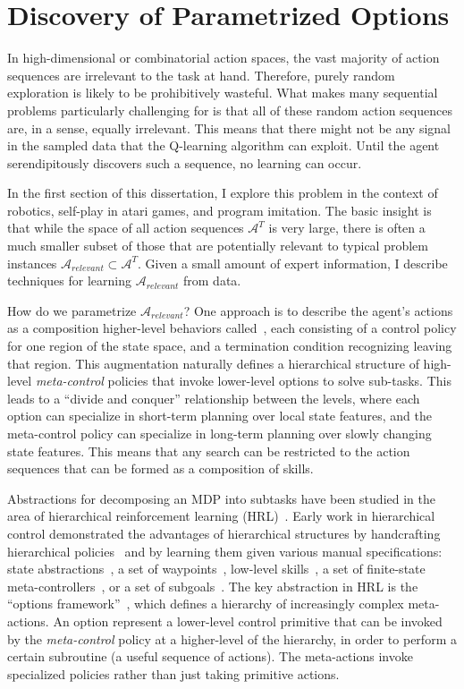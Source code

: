 \chapter{Discovery of Parametrized Options}
\setcounter{secnumdepth}{1}
In high-dimensional or combinatorial action spaces, the vast majority of action sequences are irrelevant to the task at hand.
Therefore, purely random exploration is likely to be prohibitively wasteful.
What makes many sequential problems particularly challenging for is that all of these random action sequences are, in a sense, equally irrelevant. 
This means that there might not be any signal in the sampled data that the Q-learning algorithm can exploit.
Until the agent serendipitously discovers such a sequence, no learning can occur.

In the first section of this dissertation, I explore this problem in the context of robotics, self-play in atari games, and program imitation. 
The basic insight is that while the space of all action sequences $\mathcal{A}^T$ is very large, there is often a much smaller subset of those that are potentially relevant to typical problem instances $\mathcal{A}_{relevant} \subset \mathcal{A}^T$. 
Given a small amount of expert information, I describe techniques for learning $\mathcal{A}_{relevant}$ from data.

How do we parametrize $\mathcal{A}_{relevant}$?
One approach is to describe the agent's actions as a composition higher-level behaviors called~\cite{suttonPS99}, each consisting of a control policy for one region of the state space, and a termination condition recognizing leaving that region. This augmentation naturally defines a hierarchical structure of high-level \emph{meta-control} policies that invoke lower-level options to solve sub-tasks.
This leads to a ``divide and conquer'' relationship between the levels, where each option can specialize in short-term planning over local state features, and the meta-control policy can specialize in long-term planning over slowly changing state features.
This means that any search can be restricted to the action sequences that can be formed as a composition of skills.


Abstractions for decomposing an MDP into subtasks have been studied in the area of hierarchical reinforcement learning (HRL)~\cite{parr98,suttonPS99,barto03}.
Early work in hierarchical control demonstrated the advantages of hierarchical structures by handcrafting hierarchical policies~\cite{brooks1986robust} and by learning them given various manual specifications: state abstractions~\cite{dayanH92,hengst02,kolterAN07,konidarisB07}, a set of waypoints~\cite{kaelbling93}, low-level skills~\cite{huberG97,baconP15,liaw17composing}, a set of finite-state meta-controllers~\cite{parrR97}, or a set of subgoals~\cite{suttonPS99,dietterich00}.
The key abstraction in HRL is the ``options framework''~\cite{suttonPS99}, which defines a hierarchy of increasingly complex meta-actions.
 An option represent a lower-level control primitive that can be invoked by the \emph{meta-control} policy at a higher-level of the hierarchy, in order to perform a certain subroutine (a useful sequence of actions).
The meta-actions invoke specialized policies rather than just taking primitive actions.

